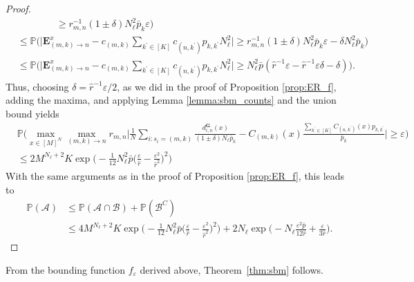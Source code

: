 \documentclass[a4paper,
               10pt,
               pdftex,
               normalheadings,
               headsepline,
               footsepline,
               headinclude,
               footinclude,
               DIV=14,
               abstracton]
{scrartcl}
\newcommand{\rv}[1]{\bm{#1}}
\begin{document}
\begin{proof}
\begin{align}
        &\qquad \qquad \geq r_{m,n}^{-1}  (1\pm \delta) N_\ell^2 \bar{p}_k \varepsilon \Big)\\
        & \leq \mathbb{P}\Big(\big\lvert \rv{E}^x_{(m,k)\to n} - c_{(m,k)} \sum_{{k^\prime} \in [K]} c_{(n,k^\prime)} p_{k,{k^\prime}} N_\ell^2 \big\rvert \geq r_{m,n}^{-1}  (1\pm \delta) N_\ell^2 \bar{p}_k \varepsilon - \delta N_\ell^2 \bar{p}_k  \Big) \\
        & \leq \mathbb{P}\Big( \big\lvert \rv{E}^x_{(m,k)\to n} - c_{(m,k)} \sum_{{k^\prime} \in [K]} c_{(n,k^\prime)} p_{k,{k^\prime}} N_\ell^2 \big\rvert \geq N_\ell^2 \bar{p} (\hat{r}^{-1} \varepsilon - \hat{r}^{-1} \varepsilon \delta - \delta) \Big).
    \end{align}
    Thus, choosing $\delta = \hat{r}^{-1} \varepsilon / 2$, as we did in the proof of Proposition \ref{prop:ER_f}, adding the maxima, and applying Lemma \ref{lemma:sbm_counts} and the union bound yields
    \begin{align}
        &\mathbb{P}\Big( \max_{x \in [M]^N} \max_{(m,k)\to n} r_{m, n} \Big\lvert \frac{1}{N} \sum_{i : s_{i} = (m,k)} \frac{d^{\rv{G}}_{i,n}(x)}{(1\pm \delta)N_\ell \bar{p}_k} - C_{(m,k)}(x) \frac{\sum_{{k^\prime} \in [K]} C_{(n,{k^\prime})}(x) p_{k,{k^\prime}}}{\bar{p}_k}  \Big\rvert \geq \varepsilon \Big) \nonumber\\
        &\leq 2 M^{N_\ell + 2} K \exp \Big( -\frac{1}{12} N_\ell^2 \bar{p} \Big(\frac{\varepsilon}{\hat{r}} -  \frac{\varepsilon^2}{\hat{r}^2}\Big)^2 \Big)
    \end{align}
    With the same arguments as in the proof of Proposition \ref{prop:ER_f}, this leads to
    \begin{align}
        \mathbb{P}(\mathcal{A}) &\leq \mathbb{P}(\mathcal{A} \cap \mathcal{B}) + \mathbb{P}(\mathcal{B}^C)\\
        &\leq 4 M^{N_\ell + 2} K \exp \Big( -\frac{1}{12} N_\ell^2 \bar{p} \Big(\frac{\varepsilon}{\hat{r}} -  \frac{\varepsilon^2}{\hat{r}^2}\Big)^2 \Big) + 2 N_\ell \exp\Big( -N_\ell \frac{\varepsilon^2 \bar{p}}{12 \hat{r}} + \frac{\varepsilon}{3 \hat{r}} \Big).
    \end{align}
\end{proof}
From the bounding function $f_\varepsilon$ derived above, Theorem~\ref{thm:sbm} follows.
\end{document}
